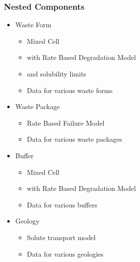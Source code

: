 \begin{frame}
  \frametitle{Nested Components}
  \begin{itemize}
    \item Waste Form
      \begin{itemize}
        \item Mixed Cell 
        \item with Rate Based Degradation Model
        \item and solubility limits
        \item Data for various waste forms
      \end{itemize}
    \item Waste Package
      \begin{itemize}
        \item Rate Based Failure Model
        \item Data for various waste packages
      \end{itemize}
    \item Buffer
      \begin{itemize}
        \item Mixed Cell 
        \item with Rate Based Degradation Model
        \item Data for various buffers
      \end{itemize}
    \item Geology
      \begin{itemize}
        \item Solute transport model
        \item Data for various geologies
      \end{itemize}
  \end{itemize}
\end{frame}

